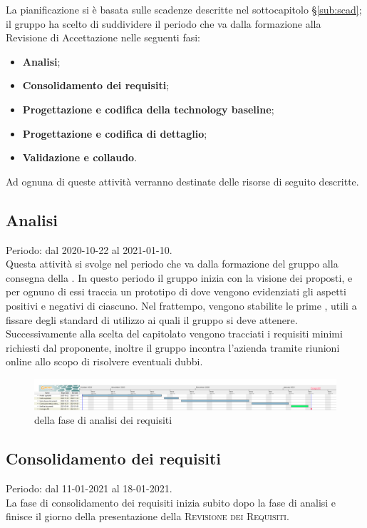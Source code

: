 \documentclass[../piano_di_progetto.tex]{subfiles}
\begin{document}
La pianificazione si è basata sulle scadenze descritte nel sottocapitolo \S\ref{sub:scad}; il gruppo ha scelto di suddividere il periodo che va dalla formazione alla Revisione di Accettazione nelle seguenti fasi:
\begin{itemize}
\item \textbf{Analisi};
\item \textbf{Consolidamento dei requisiti};
\item \textbf{Progettazione e codifica della technology baseline};
\item \textbf{Progettazione e codifica di dettaglio};
\item \textbf{Validazione e collaudo}.
\end{itemize}
Ad ognuna di queste attività verranno destinate delle risorse di seguito descritte.

\subsection{Analisi}%
\label{sub:analisi}
Periodo: dal 2020-10-22 al 2021-01-10.\\
Questa attività si svolge nel periodo che va dalla formazione del gruppo alla consegna della . In questo periodo il gruppo inizia con la visione dei  proposti, e per ognuno di essi traccia un prototipo di \textsc{} dove vengono evidenziati gli aspetti positivi e negativi di ciascuno. Nel frattempo, vengono stabilite le prime , utili a fissare degli standard di utilizzo ai quali il gruppo si deve attenere. Successivamente alla scelta del capitolato vengono tracciati i requisiti minimi richiesti dal proponente, inoltre il gruppo incontra l’azienda tramite riunioni online allo scopo di risolvere eventuali dubbi.\\

\begin{figure}[H]
\centering
\includegraphics[width=18cm]{src/img/gantt/01_RR.png}
\caption{  della fase di analisi dei requisiti}

\end{figure}


\subsection{Consolidamento dei requisiti}%
\label{sub:cons_req}
Periodo: dal 11-01-2021 al 18-01-2021.\\
La fase di consolidamento dei requisiti inizia subito dopo la fase di analisi e finisce il giorno della presentazione della \textsc{Revisione dei Requisiti}.
\end{document}
